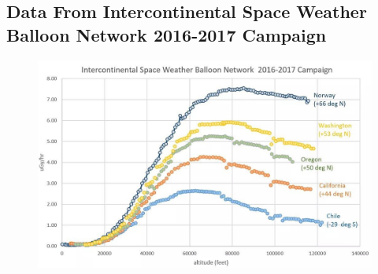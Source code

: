 \begin{appendices}
  \section{Data From Intercontinental Space Weather Balloon Network 2016-2017 Campaign}
  \label{sec:appendixa}
  \begin{figure}[h!]
	\begin{center}
	\includegraphics[width=\textwidth]{./Figures/spaceweatherdata.jpg}
	\label{fig:clusters}
	\end{center}
	\end{figure}


\end{appendices}
